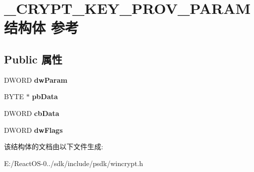 \hypertarget{struct___c_r_y_p_t___k_e_y___p_r_o_v___p_a_r_a_m}{}\section{\+\_\+\+C\+R\+Y\+P\+T\+\_\+\+K\+E\+Y\+\_\+\+P\+R\+O\+V\+\_\+\+P\+A\+R\+A\+M结构体 参考}
\label{struct___c_r_y_p_t___k_e_y___p_r_o_v___p_a_r_a_m}
\subsection*{Public 属性}
\begin{DoxyCompactItemize}
\item 
\mbox{\label{struct___c_r_y_p_t___k_e_y___p_r_o_v___p_a_r_a_m_afd3652eb7c8d3544d7f3211f5e8e7d6f}} 
D\+W\+O\+RD {\bfseries dw\+Param}
\item 
\mbox{\label{struct___c_r_y_p_t___k_e_y___p_r_o_v___p_a_r_a_m_a61edd55c914fa70a2d6521799b382479}} 
B\+Y\+TE $\ast$ {\bfseries pb\+Data}
\item 
\mbox{\label{struct___c_r_y_p_t___k_e_y___p_r_o_v___p_a_r_a_m_a59c86c3cd5c781af00a0d501cafecd9c}} 
D\+W\+O\+RD {\bfseries cb\+Data}
\item 
\mbox{\label{struct___c_r_y_p_t___k_e_y___p_r_o_v___p_a_r_a_m_a84f3d3ce81bf8c4167735ac84a843b6c}} 
D\+W\+O\+RD {\bfseries dw\+Flags}
\end{DoxyCompactItemize}


该结构体的文档由以下文件生成\+:\begin{DoxyCompactItemize}
\item 
E\+:/\+React\+O\+S-\/0../sdk/include/psdk/wincrypt.\+h\end{DoxyCompactItemize}
